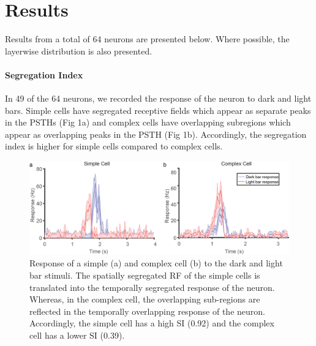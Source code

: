 					

	\section{Results}
	
		Results from a total of 64 neurons are presented below. Where possible, the layerwise distribution is also presented. 
	

		
	\paragraph {Segregation Index}	
	In 49 of the 64 neurons, we recorded the response of the neuron to dark and light bars. Simple cells have segregated receptive fields which appear as separate peaks in the PSTHs (Fig 1a) and complex cells have overlapping subregions which appear as overlapping peaks in the PSTH (Fig 1b). Accordingly, the segregation index is higher for simple cells compared to complex cells.
	
		\begin{figure}[H]
		
		\includegraphics[width=\linewidth]{LinearV1/simplecomplex.jpg}
		\caption{Response of a simple (a) and complex cell (b) to the dark and light bar stimuli. The spatially segregated RF of the simple cells is translated into the temporally segregated response of the neuron. Whereas, in the complex cell, the overlapping sub-regions are reflected in the temporally overlapping response of the neuron. Accordingly, the simple cell has a high SI (0.92) and the complex cell has a lower SI (0.39).}
		\label{fig:fig2}
	\end{figure}
	
